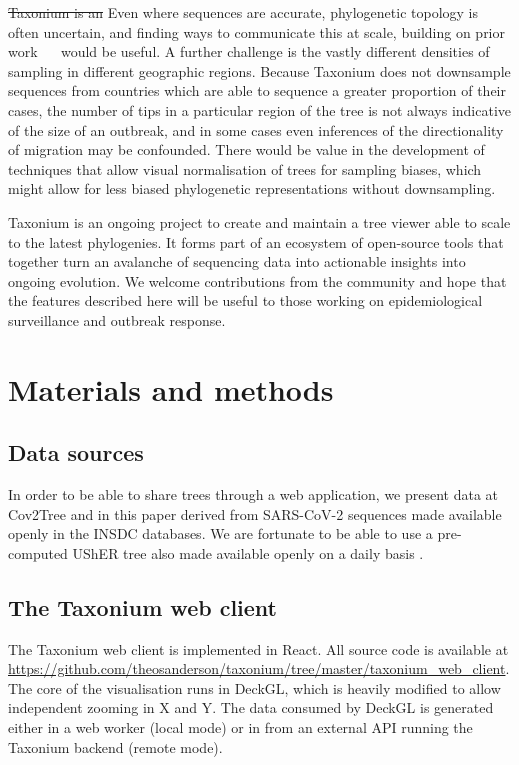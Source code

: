 \documentclass[twocolumn]{bioRxiv}
\providecommand{\DIFadd}[1]{{\protect\color{teal}#1}}
\providecommand{\DIFdel}[1]{{\protect\color{red}\sout{#1}}}
\providecommand{\DIFaddbegin}{}
\providecommand{\DIFaddend}{}
\providecommand{\DIFdelbegin}{}
\providecommand{\DIFdelend}{}
\begin{document}
\DIFdelbegin \DIFdel{Taxonium is an }\DIFdelend \DIFaddbegin \DIFadd{Even where sequences are accurate, phylogenetic topology is often uncertain, and finding ways to communicate this at scale, building on prior work \mbox{%
\citep{densitree} }\hspace{0pt}%
would be useful. A further challenge is the vastly different densities of sampling in different geographic regions. Because Taxonium does not downsample sequences from countries which are able to sequence a greater proportion of their cases, the number of tips in a particular region of the tree is not always indicative of the size of an outbreak, and in some cases even inferences of the directionality of migration may be confounded. There would be value in the development of techniques that allow visual normalisation of trees for sampling biases, which might allow for less biased phylogenetic representations without downsampling.
}

\DIFadd{Taxonium is an }\DIFaddend ongoing project to create and maintain a tree viewer able to scale to the latest phylogenies. \DIFaddbegin \DIFadd{It forms part of an ecosystem of open-source tools that together turn an avalanche of sequencing data into actionable insights into ongoing  evolution. }\DIFaddend We welcome contributions from the community and hope that the features described here will be useful to those working on epidemiological surveillance and outbreak response.

\clearpage{}
\section*{Materials and methods}

\subsection*{Data sources}
In order to be able to share trees through a web application, we present data at Cov2Tree and in this paper derived from SARS-CoV-2 sequences made available openly in the INSDC databases. We are fortunate to be able to use a pre-computed UShER tree also made available openly on a daily basis \citep{McBroome2021}.

\subsection*{The Taxonium web client}
The Taxonium web client is implemented in React. All source code is available at \url{https://github.com/theosanderson/taxonium/tree/master/taxonium_web_client}. The core of the visualisation runs in DeckGL, which is heavily modified to allow independent zooming in X and Y. The data consumed by DeckGL is generated either in a web worker (local mode) or in from an external API running the Taxonium backend (remote mode).
\end{document}

